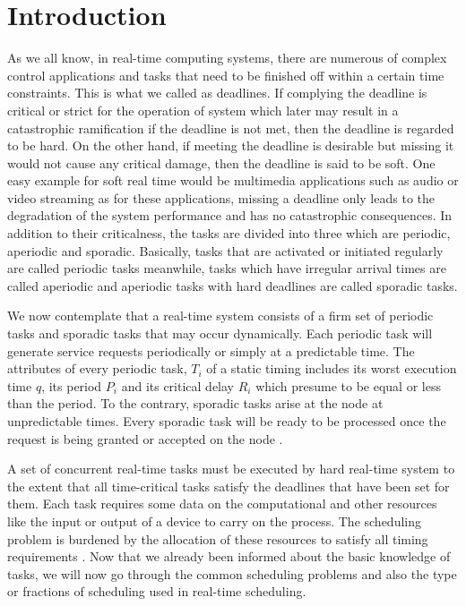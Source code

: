 \section{Introduction}
As we all know, in real-time computing systems, there are numerous of complex control applications and tasks that need to be finished off within a certain time constraints. This is what we called as deadlines. If complying the deadline is critical or strict for the operation of system which later may result in a catastrophic ramification if the deadline is not met, then the deadline is regarded to be hard. On the other hand, if meeting the deadline is desirable but missing it would not cause any critical damage, then the deadline is said to be soft. One easy example for soft real time would be multimedia applications such as audio or video streaming as for these applications, missing a deadline only leads to the degradation of the system performance and has no catastrophic consequences. In addition to their criticalness, the tasks are divided into three which are periodic, aperiodic and sporadic. Basically, tasks that are activated or initiated regularly are called periodic tasks meanwhile, tasks which have irregular arrival times are called aperiodic and aperiodic tasks with hard deadlines are called sporadic tasks. 

We now contemplate that a real-time system consists of a firm set of periodic tasks and sporadic tasks that may occur dynamically. Each periodic task will generate service requests periodically or simply at a predictable time. The attributes of every periodic task, $T_{i}$ of a static timing includes its worst execution time $q$, its period $P_{i}$ and its critical delay $R_{i}$ which presume to be equal or less than the period. To the contrary, sporadic tasks arise at the node at unpredictable times. Every sporadic task will be ready to be processed once the request is being granted or accepted on the node \cite{b5}. 

A set of concurrent real-time tasks must be executed by hard real-time system to the extent that all time-critical tasks satisfy the deadlines that have been set for them. Each task requires some data on the computational and other resources like the input or output of a device to carry on the process. The scheduling problem is burdened by the allocation of these resources to satisfy all timing requirements \cite{b3}. Now that we already been informed about the basic knowledge of tasks, we will now go through the common scheduling problems and also the type or fractions of scheduling used in real-time scheduling.
